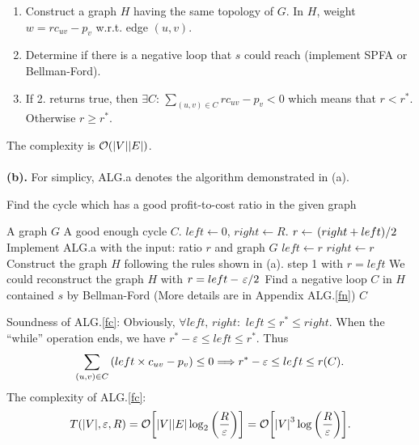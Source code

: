 \documentclass{article}
\begin{document}
\begin{enumerate}
	\item Construct a graph $H$ having the same topology of  $G$. In $H$, weight $w=rc_{uv}-p_v$ w.r.t. edge $(u,v)$.
	\item Determine if there is a negative loop that $s$ could reach (implement SPFA or Bellman-Ford).
	\item If 2. returns true, then $\exists C$: $\sum_{(u,v)\in C}rc_{uv}-p_v<0$ which means that $r<r^*$. Otherwise $r\ge r^*$.
\end{enumerate}
The complexity is $\mathcal{O}(\qty|V|\qty|E|)$.
\\\\
\textbf{(b).}
For simplicy, ALG.a denotes the algorithm demonstrated in (a).

\begin{algorithm}[H]
	\caption{Find the cycle which has a good profit-to-cost ratio in the given graph}
	\label{fc}
	\begin{algorithmic}
		\renewcommand{\algorithmicrequire}{\textbf{Input:}}
		\renewcommand{\algorithmicensure}{\textbf{Output:}}
		\REQUIRE A graph $G$
		\ENSURE A good enough cycle $C$.
		\STATE $left\gets 0$, $right\gets R$.
		\STATE $r\gets\flatfrac{(right+left)}{2}$ 
		\STATE Implement ALG.a with the input: ratio $r$ and graph  $G$
		\STATE $left\gets r$
		\ELSE
			\STATE $right\gets r$
		\ENDIF
		\ENDWHILE
		\STATE Construct the graph $H$ following the rules shown in (a). step 1 with $r=left$
		\STATE We could reconstruct the graph  $H$ with $r=left-\flatfrac{\varepsilon}{2}$
		\ENDIF
		\STATE Find a negative loop $C$ in $H$ contained $s$ by Bellman-Ford (More details are in Appendix ALG.\ref{fn})
		\RETURN $C$
	\end{algorithmic} 
\end{algorithm}
Soundness of ALG.\ref{fc}: Obviously, $\forall left,\,right:$ $left\le r^*\le right$. When the ``while'' operation ends, we have $r^*-\varepsilon\le left\le r^*$.
Thus
\[
	\sum_{(u,v)\in C}\qty(left\times c_{uv}-p_v)\le 0
	\Longrightarrow
	r^*-\varepsilon\le left\le r(C)
.\]
The complexity of ALG.\ref{fc}: 
\[
	T(\qty|V|,\varepsilon,R)
	=
	\mathcal{O}\qty[\qty|V|\qty|E|\log_2\qty(\frac{R}{\varepsilon})]
	=
	\mathcal{O}\qty[\qty|V|^3\log\qty(\frac{R}{\varepsilon})]
.\] 
\newpage
\end{document}
